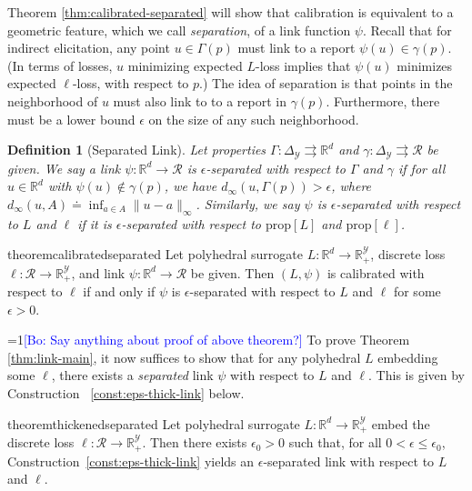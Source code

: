 \documentclass[11pt]{article}
\newcommand{\Comments}{1}
\newcommand{\mynote}[2]{\ifnum\Comments=1\textcolor{#1}{#2}\fi}
\newcommand{\raf}[1]{\mynote{darkgreen}{[RF: #1]}}
\newcommand{\bo}[1]{\mynote{blue}{[Bo: #1]}}
\newcommand{\reals}{\mathbb{R}}
\newcommand{\prop}[1]{\mathrm{prop}[#1]}
\newcommand{\simplex}{\Delta_\Y}
\newcommand{\R}{\mathcal{R}}
\newcommand{\Y}{\mathcal{Y}}
\newcommand{\toto}{\rightrightarrows}
\newtheorem{definition}{Definition}
\begin{document}
Theorem \ref{thm:calibrated-separated} will show that calibration is equivalent to a geometric feature, which we call \emph{separation}, of a link function $\psi$.
Recall that for indirect elicitation, any point $u \in \Gamma(p)$ must link to a report $\psi(u) \in \gamma(p)$.
(In terms of losses, $u$ minimizing expected $L$-loss implies that $\psi(u)$ minimizes expected $\ell$-loss, with respect to $p$.)
The idea of separation is that points in the neighborhood of $u$ must also link to to a report in $\gamma(p)$.
Furthermore, there must be a lower bound $\epsilon$ on the size of any such neighborhood.

\begin{definition}[Separated Link]\label{def:sep-link}
  Let properties $\Gamma:\simplex\toto\reals^d$ and $\gamma:\simplex\toto\R$ be given.
  We say a link $\psi:\reals^d\to\R$
  is \emph{$\epsilon$-separated with respect to $\Gamma$ and $\gamma$} if for all $u\in\reals^d$ with $\psi(u)\notin\gamma(p)$, we have $d_\infty(u,\Gamma(p)) > \epsilon$, where $d_\infty(u,A) \doteq \inf_{a\in A} \|u-a\|_\infty$.
  Similarly, we say $\psi$ is $\epsilon$-separated with respect to $L$ and $\ell$ if it is $\epsilon$-separated with respect to $\prop{L}$ and $\prop{\ell}$.
\end{definition}

\begin{restatable}{theorem}{calibratedseparated} \label{thm:calibrated-separated}
  Let polyhedral surrogate $L:\reals^d \to \reals^\Y_+$, discrete loss $\ell:\R\to\reals^\Y_+$, and link $\psi:\reals^d\to\R$ be given.
  Then $(L,\psi)$ is calibrated with respect to $\ell$ if and only if
  $\psi$ is $\epsilon$-separated with respect to $L$ and $\ell$ for some
  $\epsilon>0$.
\end{restatable}

\bo{Say anything about proof of above theorem?}
To prove Theorem \ref{thm:link-main}, it now suffices to show that for any polyhedral $L$ embedding some $\ell$, there exists a \emph{separated} link $\psi$ with respect to $L$ and $\ell$.
This is given by Construction ~\ref{const:eps-thick-link} below.

\begin{restatable}{theorem}{thickenedseparated} \label{thm:thickened-separated}
  Let polyhedral surrogate $L:\reals^d \to \reals^\Y_+$ embed the discrete loss $\ell:\R\to\reals^\Y_+$.
  Then there exists $\epsilon_0 > 0$ such that, for all $0 < \epsilon \leq \epsilon_0$, Construction~\ref{const:eps-thick-link} yields an $\epsilon$-separated link with respect to $L$ and $\ell$.
\end{restatable}
\end{document}
